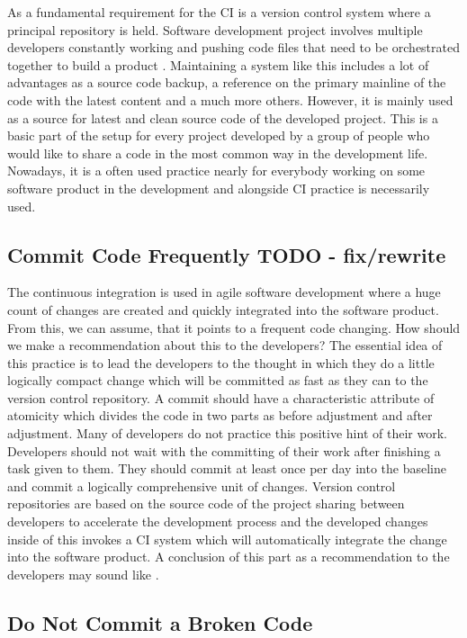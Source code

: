 As a fundamental requirement for the CI is a version control system where a principal repository is held. Software development project involves multiple developers constantly working and pushing code files that need to be orchestrated together to build a product \cite{CI-BP1}. Maintaining a system like this includes a lot of advantages as a source code backup, a reference on the primary mainline of the code with the latest content and a much more others. However, it is mainly used as a source for latest and clean source code of the developed project. This is a basic part of the setup for every project developed by a group of people who would like to share a code in the most common way in the development life. Nowadays, it is a often used practice nearly for everybody working on some software product in the development and alongside CI practice is necessarily used.

\subsection{Commit Code Frequently {\color{red}TODO - fix/rewrite}}

The continuous integration is used in agile software development where a huge count of changes are created and quickly integrated into the software product. From this, we can assume, that it points to a frequent code changing. How should we make a recommendation about this to the developers? The essential idea of this practice is to lead the developers to the thought in which they do a little logically compact change which will be committed as fast as they can to the version control repository. A commit should have a characteristic attribute of atomicity which divides the code in two parts as before adjustment and after adjustment. Many of developers do not practice this positive hint of their work. Developers should not wait with the committing of their work after finishing a task given to them. They should commit at least once per day into the baseline and commit a logically comprehensive unit of changes. Version control repositories are based on the source code of the project sharing between developers to accelerate the development process and the developed changes inside of this invokes a CI system which will automatically integrate the change into the software product. A conclusion of this part as a recommendation to the developers may sound like .

\subsection{Do Not Commit a Broken Code}


